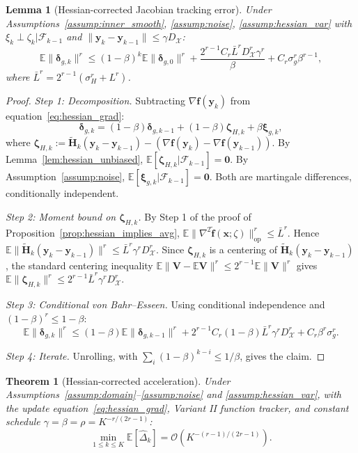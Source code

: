 \documentclass{article}
\def\eqref#1{equation~\ref{#1}}
\newcommand{\cX}{\mathcal{X}}
\def\vf{{\bm{f}}}
\def\vx{{\bm{x}}}
\def\vy{{\bm{y}}}
\def\vV{{\bm{V}}}
\def\mH{{\bm{H}}}
\newcommand{\E}{\mathbb{E}}
\newtheorem{theorem}{Theorem}
\newtheorem{lemma}{Lemma}
\begin{document}
\begin{lemma}[Hessian-corrected Jacobian tracking error] \label{lem:hessian_track}
Under Assumptions~\ref{assump:inner_smooth}, \ref{assump:noise}, \ref{assump:hessian_var} with $\xi_k \perp \zeta_k | \mathcal{F}_{k-1}$ and $\|\vy_k - \vy_{k-1}\| \le \gamma D_\cX$:
\[
\E\|\bm\delta_{g,k}\|^r \le (1-\beta)^k \E\|\bm\delta_{g,0}\|^r + \frac{2^{r-1} C_r \bar L^r D_\cX^r \gamma^r}{\beta} + C_r \sigma_g^r \beta^{r-1},
\]
where $\bar L^r = 2^{r-1}(\sigma_H^r + L^r)$.
\end{lemma}

\begin{proof}
\emph{Step 1: Decomposition.} Subtracting $\nabla\vf(\vy_k)$ from \eqref{eq:hessian_grad}:
\[
\bm\delta_{g,k} = (1-\beta)\bm\delta_{g,k-1} + (1-\beta)\bm\zeta_{H,k} + \beta\bm\xi_{g,k},
\]
where $\bm\zeta_{H,k} := \tilde\mH_k(\vy_k - \vy_{k-1}) - (\nabla\vf(\vy_k) - \nabla\vf(\vy_{k-1}))$. By Lemma~\ref{lem:hessian_unbiased}, $\E[\bm\zeta_{H,k} | \mathcal{F}_{k-1}] = \mathbf{0}$. By Assumption~\ref{assump:noise}, $\E[\bm\xi_{g,k} | \mathcal{F}_{k-1}] = \mathbf{0}$. Both are martingale differences, conditionally independent.

\emph{Step 2: Moment bound on $\bm\zeta_{H,k}$.} By Step 1 of the proof of Proposition~\ref{prop:hessian_implies_avg}, $\E\|\nabla^2\tilde\vf(\vx;\zeta)\|_{\mathrm{op}}^r \le \bar L^r$. Hence $\E\|\tilde\mH_k(\vy_k - \vy_{k-1})\|^r \le \bar L^r \gamma^r D_\cX^r$. Since $\bm\zeta_{H,k}$ is a centering of $\tilde\mH_k(\vy_k - \vy_{k-1})$, the standard centering inequality $\E\|\vV - \E\vV\|^r \le 2^{r-1}\E\|\vV\|^r$ gives $\E\|\bm\zeta_{H,k}\|^r \le 2^{r-1}\bar L^r \gamma^r D_\cX^r$.

\emph{Step 3: Conditional von Bahr--Esseen.} Using conditional independence and $(1-\beta)^r \le 1-\beta$:
\[
\E\|\bm\delta_{g,k}\|^r \le (1-\beta)\E\|\bm\delta_{g,k-1}\|^r + 2^{r-1} C_r (1-\beta)\bar L^r \gamma^r D_\cX^r + C_r \beta^r \sigma_g^r.
\]

\emph{Step 4: Iterate.} Unrolling, with $\sum_i (1-\beta)^{k-i} \le 1/\beta$, gives the claim.
\end{proof}

\begin{theorem}[Hessian-corrected acceleration] \label{thm:hessian_rate}
Under Assumptions~\ref{assump:domain}--\ref{assump:noise} and \ref{assump:hessian_var}, with the update \eqref{eq:hessian_grad}, Variant II function tracker, and constant schedule $\gamma = \beta = \rho = K^{-r/(2r-1)}$:
\[
\min_{1 \le k \le K}\E[\hat\Delta_k] = \mathcal{O}\!\left(K^{-(r-1)/(2r-1)}\right).
\]
\end{theorem}
\end{document}
